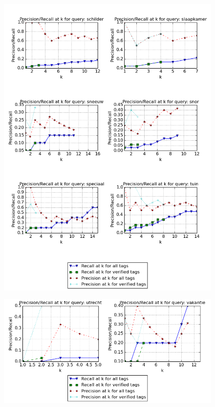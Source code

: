 \begin{figure}[H]
\includegraphics[width=\textwidth]{appendixa/queries35}
\end{figure}


\begin{figure}[H]
\includegraphics[width=\textwidth]{appendixa/queries42}
\end{figure}